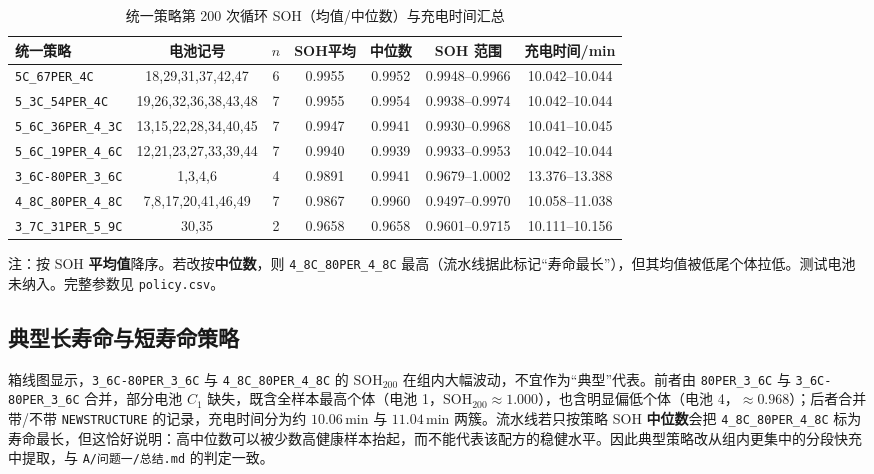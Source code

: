 \begin{table}[htbp]
\centering
\small
\caption{统一策略第 200 次循环 SOH（均值/中位数）与充电时间汇总}
\label{tab:policy_summary}
\begin{threeparttable}
\setlength{\tabcolsep}{2.8pt}
\begin{tabular}{lcccccc}
\toprule
统一策略 & 电池记号 & \(n\) & SOH平均 & 中位数 & SOH 范围 & 充电时间/min \\
\midrule
\texttt{5C\_67PER\_4C} & 18,29,31,37,42,47 & 6 & 0.9955 & 0.9952 & 0.9948--0.9966 & 10.042--10.044 \\
\texttt{5\_3C\_54PER\_4C} & 19,26,32,36,38,43,48 & 7 & 0.9955 & 0.9954 & 0.9938--0.9974 & 10.042--10.044 \\
\texttt{5\_6C\_36PER\_4\_3C} & 13,15,22,28,34,40,45 & 7 & 0.9947 & 0.9941 & 0.9930--0.9968 & 10.041--10.045 \\
\texttt{5\_6C\_19PER\_4\_6C} & 12,21,23,27,33,39,44 & 7 & 0.9940 & 0.9939 & 0.9933--0.9953 & 10.042--10.044 \\
\texttt{3\_6C-80PER\_3\_6C} & 1,3,4,6 & 4 & 0.9891 & 0.9941 & 0.9679--1.0002 & 13.376--13.388 \\
\texttt{4\_8C\_80PER\_4\_8C} & 7,8,17,20,41,46,49 & 7 & 0.9867 & 0.9960 & 0.9497--0.9970 & 10.058--11.038 \\
\texttt{3\_7C\_31PER\_5\_9C} & 30,35 & 2 & 0.9658 & 0.9658 & 0.9601--0.9715 & 10.111--10.156 \\
\bottomrule
\end{tabular}
\begin{tablenotes}
\footnotesize
\item 注：按 SOH \textbf{平均值}降序。若改按\textbf{中位数}，则 \texttt{4\_8C\_80PER\_4\_8C} 最高（流水线据此标记“寿命最长”），但其均值被低尾个体拉低。测试电池未纳入。完整参数见 \texttt{policy.csv}。
\end{tablenotes}
\end{threeparttable}
\end{table}

\subsection{典型长寿命与短寿命策略}

箱线图显示，\texttt{3\_6C-80PER\_3\_6C} 与 \texttt{4\_8C\_80PER\_4\_8C} 的 \(\mathrm{SOH}_{200}\) 在组内大幅波动，不宜作为“典型”代表。前者由 \texttt{80PER\_3\_6C} 与 \texttt{3\_6C-80PER\_3\_6C} 合并，部分电池 \(C_1\) 缺失，既含全样本最高个体（电池 1，\(\mathrm{SOH}_{200}\approx 1.000\)），也含明显偏低个体（电池 4，\(\approx 0.968\)）；后者合并带/不带 \texttt{NEWSTRUCTURE} 的记录，充电时间分为约 \(10.06\)\,min 与 \(11.04\)\,min 两簇。流水线若只按策略 SOH \textbf{中位数}会把 \texttt{4\_8C\_80PER\_4\_8C} 标为寿命最长，但这恰好说明：高中位数可以被少数高健康样本抬起，而不能代表该配方的稳健水平。因此典型策略改从组内更集中的分段快充中提取，与 \texttt{A/问题一/总结.md} 的判定一致。

